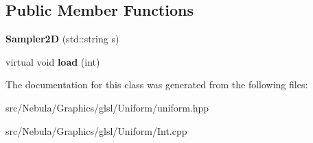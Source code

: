 \subsection*{\-Public \-Member \-Functions}
\begin{DoxyCompactItemize}
\item 
\hypertarget{classNeb_1_1glsl_1_1Uniform_1_1Scalar_1_1Sampler2D_a91f35bdd1915418833da9db087bf8689}{{\bfseries \-Sampler2\-D} (std\-::string s)}\label{classNeb_1_1glsl_1_1Uniform_1_1Scalar_1_1Sampler2D_a91f35bdd1915418833da9db087bf8689}

\item 
\hypertarget{classNeb_1_1glsl_1_1Uniform_1_1Scalar_1_1Sampler2D_aa6042d85202d728e4ef81989f5034979}{virtual void {\bfseries load} (int)}\label{classNeb_1_1glsl_1_1Uniform_1_1Scalar_1_1Sampler2D_aa6042d85202d728e4ef81989f5034979}

\end{DoxyCompactItemize}


\-The documentation for this class was generated from the following files\-:\begin{DoxyCompactItemize}
\item 
src/\-Nebula/\-Graphics/glsl/\-Uniform/uniform.\-hpp\item 
src/\-Nebula/\-Graphics/glsl/\-Uniform/\-Int.\-cpp\end{DoxyCompactItemize}
